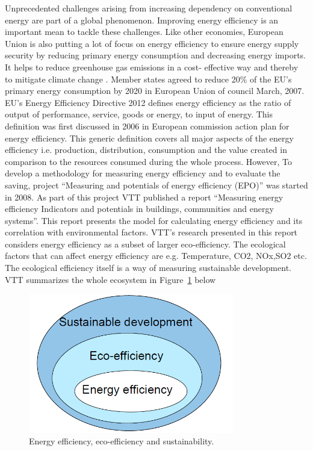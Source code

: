 Unprecedented challenges arising from increasing dependency on conventional energy are part of a global phenomenon. Improving energy efficiency is an important mean to tackle these challenges. Like other economies, European Union is also putting a lot of focus on energy efficiency to ensure energy supply security  by reducing primary energy consumption and decreasing energy imports. It helps to reduce greenhouse gas emissions in a cost- effective way and thereby to mitigate climate change \cite{eu2012ee}. Member states agreed to reduce 20\% of the EU's primary energy consumption by 2020 in European Union of council March, 2007.  EU's Energy Efficiency Directive 2012 \cite{eu2012ee} defines energy efficiency as the ratio of output of performance, service, goods or energy, to input of energy. This definition was first discussed in 2006 in European commission action plan for energy efficiency. This generic definition covers all major aspects of the energy efficiency i.e. production, distribution, consumption and the value created in comparison to the resources consumed during the whole process.  However, To develop a methodology for measuring energy efficiency and to evaluate the saving, project ``Measuring and potentials of energy efficiency (EPO)'' was started in 2008\cite{arundel2009measuring}. As part of this project VTT published a report ``Measuring energy efficiency Indicators and potentials in buildings, communities and energy systems''\cite{forsstrommeasuring}. This report presents the model for calculating energy efficiency and its correlation with environmental factors.  VTT's research presented in this report considers energy efficiency as a subset of larger eco-efficiency. The ecological factors that can affect energy efficiency are e.g.  Temperature, CO2, NOx,SO2 etc. The ecological efficiency itself is a way of measuring sustainable development. VTT summarizes the whole ecosystem in Figure~\ref{fig:eco-effeciency} below

\begin{figure}[ht]
  \begin{center}
    \includegraphics[width=0.8\textwidth]{images/eco-effeciency.png}
    \caption{ Energy efficiency, eco-efficiency and sustainability\cite{forsstrommeasuring}.}
    \label{fig:eco-effeciency}
  \end{center}
\end{figure}

